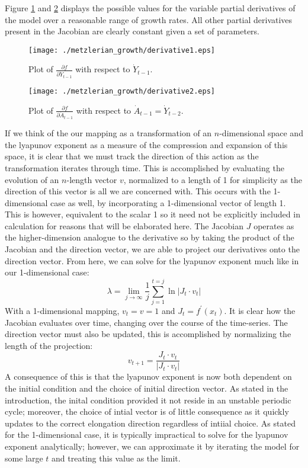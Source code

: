 Figure \ref{derivative1} and \ref{derivative2} displays the possible values for the variable partial derivatives of the model over a reasonable range of growth rates. All other partial derivatives present in the Jacobian are clearly constant given a set of parameters.

\begin{figure}[h]
    \centering
    \texttt{[image: ./metzlerian\_growth/derivative1.eps]}
    \caption{Plot of $\frac{\partial f}{\partial \dot Y_{t-1}}$ with respect to $\dot Y_{t-1}$.}
    \label{derivative1}
\end{figure}

\begin{figure}
    \centering
    \texttt{[image: ./metzlerian\_growth/derivative2.eps]}
    \caption{Plot of $\frac{\partial f}{\partial \dot A_{t-1}}$ with respect to $\dot A_{t-1}=\dot Y_{t-2}$.}
    \label{derivative2}
\end{figure}

If we think of the our mapping as a transformation of an $n$-dimensional space and the lyapunov exponent as a measure of the compression and expansion of this space, it is clear that we must track the direction of this action as the transformation iterates through time. This is accomplished by evaluating the evolution of an $n$-length vector $v$, normalized to a length of 1 for simplicity as the direction of this vector is all we are concerned with. This occurs with the 1-dimensional case as well, by incorporating a 1-dimensional vector of length 1. This is however, equivalent to the scalar 1 so it need not be explicitly included in calculation for reasons that will be elaborated here. The Jacobian $J$ operates as the higher-dimension analogue to the derivative so by taking the product of the Jacobian and the direction vector, we are able to project our derivatives onto the direction vector. From here, we can solve for the lyapunov exponent much like in our 1-dimensional case:
\begin{equation}
    \lambda = \lim_{j\to\infty}\frac{1}{j}\sum^{t=j}_{j=1}\ln\lvert J_t\cdot v_t\rvert
\end{equation}
With a 1-dimensional mapping, $v_t=v=1$ and $J_t=f^\prime(x_t)$. It is clear how the Jacobian evaluates over time, changing over the course of the time-series. The direction vector must also be updated, this is accomplished by normalizing the length of the projection:
\begin{equation}
    v_{t+1}=\frac{J_t\cdot v_t}{\lvert J_t\cdot v_t\rvert}
\end{equation}
A consequence of this is that the lyapunov exponent is now both dependent on the initial condition and the choice of initial direction vector. As stated in the introduction, the inital condition provided it not reside in an unstable periodic cycle; moreover, the choice of intial vector is of little consequence as it quickly updates to the correct elongation direction regardless of intiial choice. As stated for the 1-dimensional case, it is typically impractical to solve for the lyapunov exponent analytically; however, we can approximate it by iterating the model for some large $t$ and treating this value as the limit.

